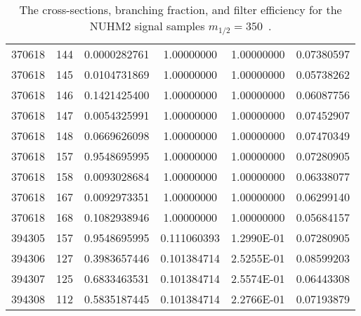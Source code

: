 \begin{table}[htp]
{{\begin{tabular}{cccccc}
370618 & 144 & 0.0000282761 & 1.00000000 & 1.00000000 & 0.07380597\\
370618 & 145 & 0.0104731869 & 1.00000000 & 1.00000000 & 0.05738262\\
370618 & 146 & 0.1421425400 & 1.00000000 & 1.00000000 & 0.06087756\\
370618 & 147 & 0.0054325991 & 1.00000000 & 1.00000000 & 0.07452907\\
370618 & 148 & 0.0669626098 & 1.00000000 & 1.00000000 & 0.07470349\\
370618 & 157 & 0.9548695995 & 1.00000000 & 1.00000000 & 0.07280905\\
370618 & 158 & 0.0093028684 & 1.00000000 & 1.00000000 & 0.06338077\\
370618 & 167 & 0.0092973351 & 1.00000000 & 1.00000000 & 0.06299140\\
370618 & 168 & 0.1082938946 & 1.00000000 & 1.00000000 & 0.05684157\\
394305 & 157 & 0.9548695995 & 0.111060393 & 1.2990E-01 & 0.07280905\\
394306 & 127 & 0.3983657446 & 0.101384714 & 2.5255E-01 & 0.08599203\\
394307 & 125 & 0.6833463531 & 0.101384714 & 2.5574E-01 & 0.06443308\\
394308 & 112 & 0.5835187445 & 0.101384714 & 2.2766E-01 & 0.07193879\\
\hline
\hline
\end{tabular}
}
}
\caption{The cross-sections, branching fraction, and filter efficiency for the NUHM2 signal samples $m_{1/2} = 350$~{\GeV}.}
\label{tab:app_xsec_m12_350}
\end{table}%

